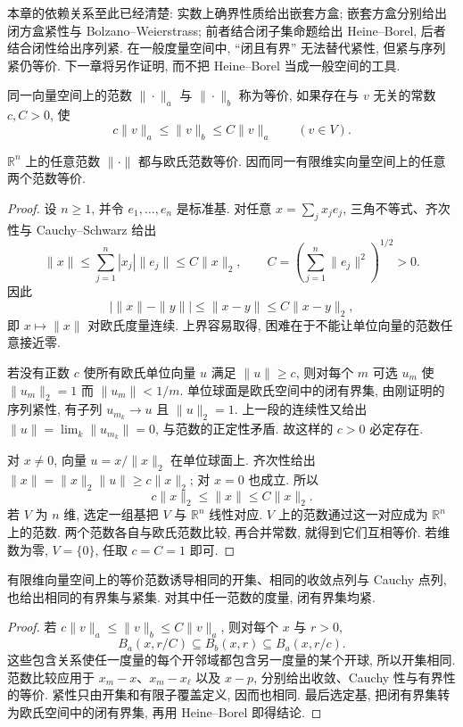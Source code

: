 本章的依赖关系至此已经清楚: 实数上确界性质给出嵌套方盒; 嵌套方盒分别给出闭方盒紧性与 Bolzano--Weierstrass; 前者结合闭子集命题给出 Heine--Borel, 后者结合闭性给出序列紧. 在一般度量空间中, ``闭且有界'' 无法替代紧性, 但紧与序列紧仍等价. 下一章将另作证明, 而不把 Heine--Borel 当成一般空间的工具.

\begin{definition}[等价范数]
同一向量空间上的范数 $\|\cdot\|_a$ 与 $\|\cdot\|_b$ 称为等价, 如果存在与 $v$ 无关的常数 $c,C>0$, 使
\[
 c\|v\|_a\leq\|v\|_b\leq C\|v\|_a
 \qquad(v\in V).
\]
\end{definition}

\begin{theorem}[有限维范数等价]
\label{ch:eucompact:norm-equivalence}
$\mathbb{R}^n$ 上的任意范数 $\|\cdot\|$ 都与欧氏范数等价. 因而同一有限维实向量空间上的任意两个范数等价.
\end{theorem}
\begin{proof}
设 $n\geq1$, 并令 $e_1,\ldots,e_n$ 是标准基. 对任意 $x=\sum_jx_je_j$, 三角不等式、齐次性与 Cauchy--Schwarz 给出
\[
 \|x\|\leq\sum_{j=1}^n|x_j|\|e_j\|
 \leq C\|x\|_2,\qquad
 C=\left(\sum_{j=1}^n\|e_j\|^2\right)^{1/2}>0.
\]
因此
\[
 \bigl|\|x\|-\|y\|\bigr|\leq\|x-y\|\leq C\|x-y\|_2,
\]
即 $x\mapsto\|x\|$ 对欧氏度量连续. 上界容易取得, 困难在于不能让单位向量的范数任意接近零.

若没有正数 $c$ 使所有欧氏单位向量 $u$ 满足 $\|u\|\geq c$, 则对每个 $m$ 可选 $u_m$ 使 $\|u_m\|_2=1$ 而 $\|u_m\|<1/m$. 单位球面是欧氏空间中的闭有界集, 由刚证明的序列紧性, 有子列 $u_{m_k}\to u$ 且 $\|u\|_2=1$. 上一段的连续性又给出 $\|u\|=\lim_k\|u_{m_k}\|=0$, 与范数的正定性矛盾. 故这样的 $c>0$ 必定存在.

对 $x\ne0$, 向量 $u=x/\|x\|_2$ 在单位球面上. 齐次性给出
$\|x\|=\|x\|_2\|u\|\geq c\|x\|_2$; 对 $x=0$ 也成立. 所以
\[
 c\|x\|_2\leq\|x\|\leq C\|x\|_2.
\]
若 $V$ 为 $n$ 维, 选定一组基把 $V$ 与 $\mathbb{R}^n$ 线性对应. $V$ 上的范数通过这一对应成为 $\mathbb{R}^n$ 上的范数. 两个范数各自与欧氏范数比较, 再合并常数, 就得到它们互相等价. 若维数为零, $V=\{0\}$, 任取 $c=C=1$ 即可.
\end{proof}

\begin{corollary}[有限维空间中的拓扑与紧性]
\label{ch:eucompact:norm-topology}
有限维向量空间上的等价范数诱导相同的开集、相同的收敛点列与 Cauchy 点列, 也给出相同的有界集与紧集. 对其中任一范数的度量, 闭有界集均紧.
\end{corollary}
\begin{proof}
若 $c\|v\|_a\leq\|v\|_b\leq C\|v\|_a$, 则对每个 $x$ 与 $r>0$,
\[
 B_a(x,r/C)\subseteq B_b(x,r)\subseteq B_a(x,r/c).
\]
这些包含关系使任一度量的每个开邻域都包含另一度量的某个开球, 所以开集相同. 范数比较应用于 $x_m-x$、$x_m-x_\ell$ 以及 $x-p$, 分别给出收敛、Cauchy 性与有界性的等价. 紧性只由开集和有限子覆盖定义, 因而也相同. 最后选定基, 把闭有界集转为欧氏空间中的闭有界集, 再用 Heine--Borel 即得结论.
\end{proof}

